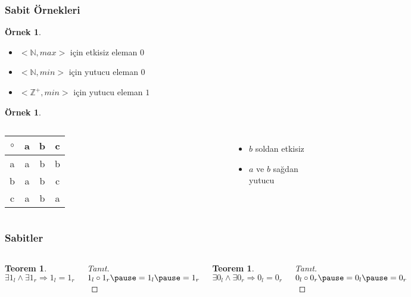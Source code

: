 \documentclass[dvipsnames]{beamer}
\theoremstyle{definition}
\theoremstyle{example}
\newtheorem{ornek}[theorem]{Örnek}
\theoremstyle{plain}
\newtheorem{teorem}[theorem]{Teorem}
\begin{document}
\begin{frame}
  \frametitle{Sabit Örnekleri}

  \begin{ornek}
    \begin{itemize}
      \item $<\mathbb{N}, max>$ için etkisiz eleman $0$
      \item $<\mathbb{N}, min>$ için yutucu eleman $0$
      \item $<\mathbb{Z}^+, min>$ için yutucu eleman $1$
    \end{itemize}
  \end{ornek}

  \pause
  \begin{ornek}
    \begin{columns}
      \begin{tabular}{c||c|c|c}
        $\circ$ & a & b & c\\\hline\hline
              a & a & b & b\\\hline
              b & a & b & c\\\hline
              c & a & b & a
      \end{tabular}

      \begin{itemize}
        \item $b$ soldan etkisiz
        \item $a$ ve $b$ sağdan yutucu
      \end{itemize}
    \end{columns}
  \end{ornek}
\end{frame}

\begin{frame}
  \frametitle{Sabitler}

  \begin{columns}
    \begin{teorem}
      $\exists 1_l \wedge \exists 1_r \Rightarrow 1_l = 1_r$
    \end{teorem}

    \pause
    \begin{proof}[Tanıt]
      $1_l \circ 1_r \pause = 1_l \pause = 1_r$
    \end{proof}

    \pause
    \begin{teorem}
      $\exists 0_l \wedge \exists 0_r \Rightarrow 0_l = 0_r$
    \end{teorem}

    \pause
    \begin{proof}[Tanıt]
      $0_l \circ 0_r \pause = 0_l \pause = 0_r$
    \end{proof}
  \end{columns}
\end{frame}
\end{document}
